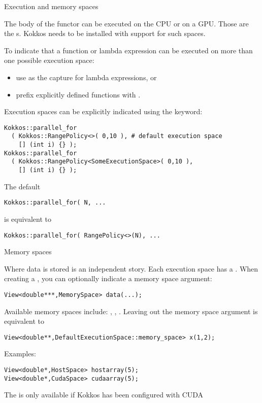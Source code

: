  {Execution and memory spaces}

The body of the functor can be executed on the CPU or on a GPU.
Those are the s.
Kokkos needs to be installed with support for such spaces.

To indicate that a function or lambda expression can be executed
on more than one possible execution space:
\begin{itemize}
\item use  as the capture for lambda expressions, or
\item prefix explicitly defined functions with .
\end{itemize}
Execution spaces can be explicitly indicated using the 
keyword:
\begin{lstlisting}
Kokkos::parallel_for
  ( Kokkos::RangePolicy<>( 0,10 ), # default execution space
    [] (int i) {} );
Kokkos::parallel_for
  ( Kokkos::RangePolicy<SomeExecutionSpace>( 0,10 ), 
    [] (int i) {} );
\end{lstlisting}
The default
\begin{lstlisting}
Kokkos::parallel_for( N, ...
\end{lstlisting}
is equivalent to 
\begin{lstlisting}
Kokkos::parallel_for( RangePolicy<>(N), ...
\end{lstlisting}

 {Memory spaces}

Where data is stored is an independent story.
Each execution space has a .
When creating a ,
you can optionally indicate a memory space argument:
\begin{lstlisting}
View<double***,MemorySpace> data(...);
\end{lstlisting}
Available memory spaces include:
, , .
Leaving out the memory space argument is equivalent to
\begin{lstlisting}
View<double**,DefaultExecutionSpace::memory_space> x(1,2);
\end{lstlisting}

Examples:
\begin{lstlisting}
View<double*,HostSpace> hostarray(5);
View<double*,CudaSpace> cudaarray(5);
\end{lstlisting}

The  is only available
if Kokkos has been configured with \ac{CUDA}

